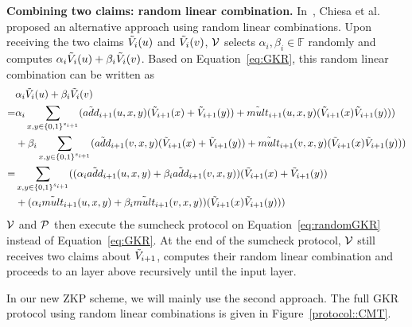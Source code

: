 \smallskip\noindent\textbf{Combining two claims: random linear combination.}  In~\cite{zksumcheck}, Chiesa et al. proposed an alternative approach using random linear combinations. Upon receiving the two claims $\tV_i(u)$ and $\tV_i(v)$, $\V$ selects $\alpha_i, \beta_i\in\mathbb{F}$ randomly and computes $\alpha_i\tV_i(u)+\beta_i\tV_i(v)$. Based on Equation~\ref{eq:GKR}, this random linear combination can be written as
\begin{align}\label{eq:randomGKR}
&\alpha_i\tV_i(u)+\beta_i\tV_i(v)\nonumber\\
=&\alpha_i\sum_{x, y \in\binary^{s_{i+1}}}(\tadd_{i+1}(u,x,y)(\tV_{i+1}(x)+\tV_{i+1}(y))+\tmult_{i+1}(u,x,y)(\tV_{i+1}(x)\tV_{i+1}(y)))\nonumber\\
&+\beta_i\sum_{x, y \in\binary^{s_{i+1}}}(\tadd_{i+1}(v,x,y)(\tV_{i+1}(x)+\tV_{i+1}(y))+\tmult_{i+1}(v,x,y)(\tV_{i+1}(x)\tV_{i+1}(y)))\nonumber\\
=&\sum_{x, y \in\binary^{s_{i+1}}}((\alpha_i\tadd_{i+1}(u,x,y)+\beta_i\tadd_{i+1}(v,x,y))(\tV_{i+1}(x)+\tV_{i+1}(y))\nonumber\\
&+(\alpha_i\tmult_{i+1}(u,x,y)+\beta_i\tmult_{i+1}(v,x,y))(\tV_{i+1}(x)\tV_{i+1}(y)))
\end{align}
$\V$ and $\P$ then execute the sumcheck protocol on Equation~\ref{eq:randomGKR} instead of Equation~\ref{eq:GKR}. At the end of the sumcheck protocol, $\V$ still receives two claims about $\tV_{i+1}$, computes their random linear combination and proceeds to an layer above recursively until the input layer.

In our new ZKP scheme, we will mainly use the second approach. The full GKR protocol using random linear combinations is given in Figure~\ref{protocol::CMT}.


